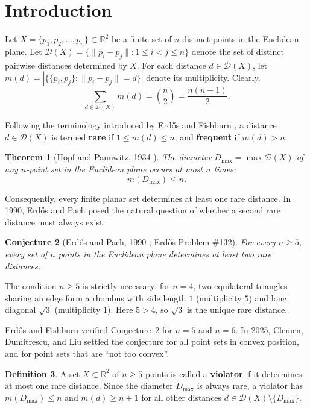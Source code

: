 \documentclass[11pt,reqno]{article}
\newtheorem{theorem}{Theorem}
\newtheorem{conjecture}[theorem]{Conjecture}
\theoremstyle{definition}
\newtheorem{definition}[theorem]{Definition}
\begin{document}
\section{Introduction}

Let $X = \{p_1, p_2, \dots, p_n\} \subset \mathbb{R}^2$ be a finite set of $n$ distinct points in the Euclidean plane. Let $\mathcal{D}(X) = \{\|p_i - p_j\| : 1 \le i < j \le n\}$ denote the set of distinct pairwise distances determined by $X$. For each distance $d \in \mathcal{D}(X)$, let $m(d) = |\{\{p_i, p_j\} : \|p_i - p_j\| = d\}|$ denote its multiplicity. Clearly,
\[
\sum_{d \in \mathcal{D}(X)} m(d) = \binom{n}{2} = \frac{n(n-1)}{2}.
\]

Following the terminology introduced by Erd\H{o}s and Fishburn \cite{ErFi95}, a distance $d \in \mathcal{D}(X)$ is termed \textbf{rare} if $1 \le m(d) \le n$, and \textbf{frequent} if $m(d) > n$.

\begin{theorem}[Hopf and Pannwitz, 1934 \cite{HoPa34}]
The diameter $D_{\max} = \max \mathcal{D}(X)$ of any $n$-point set in the Euclidean plane occurs at most $n$ times:
\[
m(D_{\max}) \le n.
\]
\end{theorem}
Consequently, every finite planar set determines at least one rare distance. In 1990, Erd\H{o}s and Pach posed the natural question of whether a second rare distance must always exist.

\begin{conjecture}[Erd\H{o}s and Pach, 1990 \cite{ErPa90}; Erd\H{o}s Problem \#132]\label{conj:erdos132}
For every $n \ge 5$, every set of $n$ points in the Euclidean plane determines at least two rare distances.
\end{conjecture}

The condition $n \ge 5$ is strictly necessary: for $n = 4$, two equilateral triangles sharing an edge form a rhombus with side length $1$ (multiplicity $5$) and long diagonal $\sqrt{3}$ (multiplicity $1$). Here $5 > 4$, so $\sqrt{3}$ is the unique rare distance.

Erd\H{o}s and Fishburn \cite{ErFi96} verified Conjecture~\ref{conj:erdos132} for $n = 5$ and $n = 6$. In 2025, Clemen, Dumitrescu, and Liu \cite{CDL25} settled the conjecture for all point sets in convex position, and for point sets that are ``not too convex''.

\begin{definition}\label{def:violator}
A set $X \subset \mathbb{R}^2$ of $n \ge 5$ points is called a \textbf{violator} if it determines at most one rare distance. Since the diameter $D_{\max}$ is always rare, a violator has $m(D_{\max}) \le n$ and $m(d) \ge n + 1$ for all other distances $d \in \mathcal{D}(X) \setminus \{D_{\max}\}$.
\end{definition}
\end{document}
